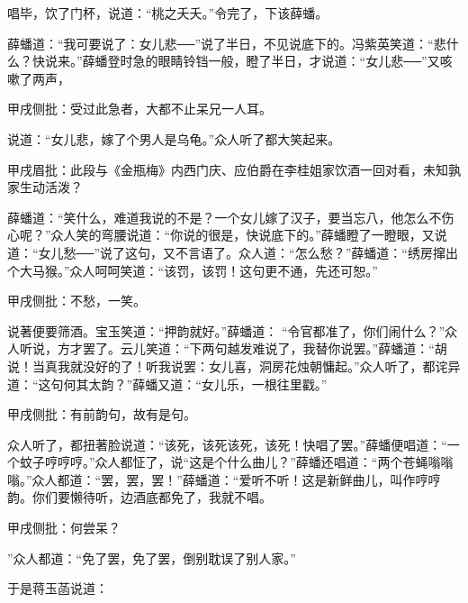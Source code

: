 \begin{parag}
    唱毕，饮了门杯，说道：“桃之夭夭。”令完了，下该薛蟠。
\end{parag}


\begin{parag}
    薛蟠道：“我可要说了：女儿悲──”说了半日，不见说底下的。冯紫英笑道：“悲什么？快说来。”薛蟠登时急的眼睛铃铛一般，瞪了半日，才说道：“女儿悲──”又咳嗽了两声，\begin{note}甲戌侧批：受过此急者，大都不止呆兄一人耳。\end{note}说道：“女儿悲，嫁了个男人是乌龟。”众人听了都大笑起来。\begin{note}甲戌眉批：此段与《金瓶梅》内西门庆、应伯爵在李桂姐家饮酒一回对看，未知孰家生动活泼？\end{note}薛蟠道：“笑什么，难道我说的不是？一个女儿嫁了汉子，要当忘八，他怎么不伤心呢？”众人笑的弯腰说道：“你说的很是，快说底下的。”薛蟠瞪了一瞪眼，又说道：“女儿愁──”说了这句，又不言语了。众人道：“怎么愁？”薛蟠道：“绣房撺出个大马猴。”众人呵呵笑道：“该罚，该罚！这句更不通，先还可恕。”\begin{note}甲戌侧批：不愁，一笑。\end{note}说著便要筛酒。宝玉笑道：“押韵就好。”薛蟠道： “令官都准了，你们闹什么？”众人听说，方才罢了。云儿笑道：“下两句越发难说了，我替你说罢。”薛蟠道：“胡说！当真我就没好的了！听我说罢：女儿喜，洞房花烛朝慵起。”众人听了，都诧异道：“这句何其太韵？”薛蟠又道：“女儿乐，一根往里戳。”\begin{note}甲戌侧批：有前韵句，故有是句。\end{note}众人听了，都扭著脸说道：“该死，该死该死，该死！快唱了罢。”薛蟠便唱道：“一个蚊子哼哼哼。”众人都怔了，说“这是个什么曲儿？”薛蟠还唱道：“两个苍蝇嗡嗡嗡。”众人都道：“罢，罢，罢！”薛蟠道：“爱听不听！这是新鲜曲儿，叫作哼哼韵。你们要懒待听，边酒底都免了，我就不唱。\begin{note}甲戌侧批：何尝呆？\end{note}”众人都道：“免了罢，免了罢，倒别耽误了别人家。”
\end{parag}


\begin{parag}
    于是蒋玉菡说道：
\end{parag}


